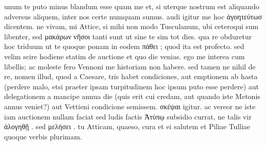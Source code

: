 


 unum te puto minus blandum esse quam me et, si uterque nostrum est aliquando adversus aliquem, inter nos certe numquam sumus. audi igitur me hoc ἀγοητεύτωσ dicentem. ne vivam, mi Attice, si mihi non modo Tusculanum, ubi ceteroqui sum libenter, sed μακάρων νῆσοι tanti sunt ut sine te sim tot dies. qua re obduretur hoc triduum ut te quoque ponam in eodem πάθει ; quod ita est profecto. sed velim scire hodiene statim de auctione et quo die venias. ego me interea cum libellis; ac moleste fero Vennoni me historiam non habere. sed tamen ne nihil de re, nomen illud, quod a Caesare, tris habet condiciones, aut emptionem ab hasta (perdere malo, etsi praeter ipsam turpitudinem hoc ipsum puto esse perdere) aut delegationem a mancipe annua die (quis erit cui credam, aut quando iste Metonis annus veniet?) aut Vettieni condicione semissem. σκέψαι igitur. ac vereor ne iste iam auctionem nullam faciat sed ludis factis Ἀτύπῳ subsidio currat, ne talis vir ἀλογηθῇ . sed μελήσει . tu Atticam, quaeso, cura et ei salutem et Piliae Tulliae quoque verbis plurimam.
